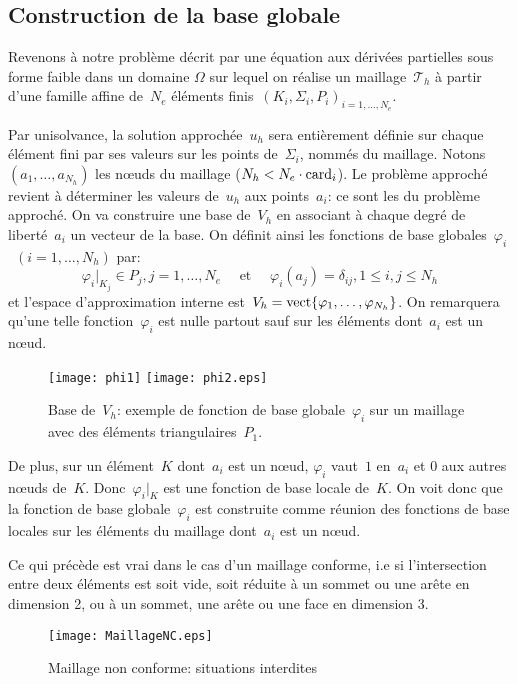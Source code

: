 \medskip
\subsection{Construction de la base globale}
Revenons à notre problème décrit par une équation aux dérivées partielles sous forme faible dans un domaine $\Omega$ sur lequel on réalise un maillage~$\mathcal{T}_h$ à partir d'une famille affine de~$N_e$ éléments finis~$(K_i, \Sigma_i, P_i)_{i=1,\ldots,N_e}$.

Par unisolvance, la solution approchée~$u_h$ sera entièrement définie sur chaque élément fini par ses valeurs sur les points de~$\Sigma_i$, nommés  du maillage.
Notons~$(a_1,\ldots, a_{N_h})$ les nœuds du maillage ($N_h<N_e \cdot \mathrm{card}_i$).
Le problème approché revient à déterminer les valeurs de~$u_h$ aux points~$a_i$: ce sont les  du problème approché.
On va construire une base de~$V_h$ en associant à chaque degré de liberté~$a_i$ un vecteur de la base.
On définit ainsi les fonctions de base globales~$\varphi_i$~$(i = 1,\ldots, N_h)$ par:
\begin{equation}\varphi_i|_{K_j} \in P_j, j = 1,\ldots, N_e \quad \text{ et }\quad \varphi_i(a_j) = \delta_{ij}, 1\le i,j\le N_h\end{equation}
et l'espace d'approximation interne est~$V_h=\operatorname{vect}\{\varphi_1,\ldots, \varphi_{N_h}\}$.
On remarquera qu'une telle fonction~$\varphi_i$ est nulle partout sauf sur les éléments
dont~$a_i$ est un nœud.
\begin{figure}[h!]
\centering
\texttt{[image: phi1]} \hspace{5em} \texttt{[image: phi2.eps]}
\caption{\label{BaseVh} Base de~$V_h$: exemple de fonction de base globale~$\varphi_i$ sur un maillage avec des éléments triangulaires~$P_1$.}
\end{figure}

\medskip
De plus, sur un élément~$K$ dont~$a_i$ est un nœud, $\varphi_i$ vaut~$1$ en~$a_i$ et $0$ aux autres nœuds de~$K$. Donc~$\varphi_i|_K$ est une fonction de base locale de~$K$.
On voit donc que la fonction de base globale~$\varphi_i$ est construite comme réunion des fonctions de base locales sur les éléments du maillage dont~$a_i$ est un nœud.

\medskip
\begin{remarque} Ce qui précède est vrai dans le cas d'un maillage conforme, i.e si l'intersection entre deux éléments est soit vide, soit réduite à un sommet ou une arête en dimension 2, ou à un sommet, une arête ou une face en dimension 3.\end{remarque}
\begin{figure}[h!]
\centering
\texttt{[image: MaillageNC.eps]}
\caption{Maillage non conforme: situations interdites}\label{maillageNC}
\end{figure}


